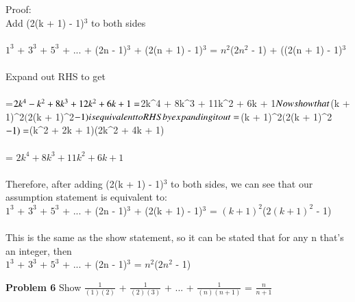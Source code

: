 \documentclass[12pt]{article}
\begin{document}
Proof: \\
	Add (2(k + 1) - 1)$^{3}$ to both sides \\
	\\
	 $1^{3}$ + $3^{3}$ + $5^{3}$ + ... + (2n - 1)$^{3}$ + (2(n + 1) - 1)$^{3}$ = $n^{2}$($2n^{2}$ - 1) + ((2(n + 1) - 1)$^{3}$\\
	 \\
	 Expand out RHS to get\\
	 \\
	 =$2k^{4} - k^{2} + 8k^{3} + 12k^{2} + 6k + 1  \\
	 = $2k^{4} + 8k^{3} + 11k^{2} + 6k + 1$ \\
	 \\
	 Now show that $(k + 1)^{2}$($2(k + 1)^{2}$ - 1) is equivalent to RHS by expanding it out\\
	 \\
	 =$(k + 1)^{2}$($2(k + 1)^{2}$ - 1) \\
	 \\
	 =$(k^{2} + 2k + 1)(2k^{2} + 4k + 1) \\
	 \\
	 = $2k^{4} + 8k^{3} + 11k^{2} + 6k + 1$ \\
	 \\
	 Therefore, after adding (2(k + 1) - 1)$^{3}$ to both sides, we can see that our assumption statement is equivalent to: \\
	 $1^{3}$ + $3^{3}$ + $5^{3}$ + ... + (2n - 1)$^{3}$ + (2(k + 1) - 1)$^{3}$ = $(k + 1)^{2}$($2(k + 1)^{2}$ - 1) \\ \\
	 This is the same as the show statement, so it can be stated that for any n that's an integer, then \\
	 $1^{3}$ + $3^{3}$ + $5^{3}$ + ... + (2n - 1)$^{3}$ = $n^{2}$($2n^{2}$ - 1) \\


\par

\par
\bigskip
{\bf Problem
6
}
Show $\frac{1}{(1)(2)}$ + $\frac{1}{(2)(3)}$ + ... + $\frac{1}{(n)(n+1)}$ = $\frac{n}{n+1}$
\end{document}
